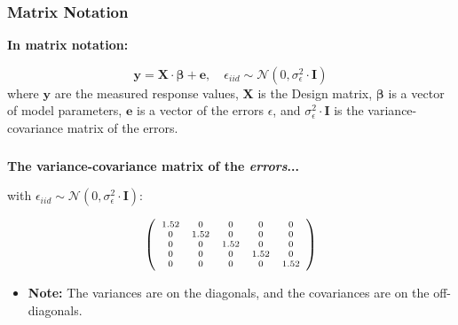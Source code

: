 \documentclass{beamer}
\begin{document}
\begin{frame}
  \frametitle{Matrix Notation}
  \textbf{In matrix notation:}
  
  \begin{equation*}
  \mathbf{y} = \mathbf{X} \cdot \mathbf{\beta} + \mathbf{e}, \quad \epsilon_{iid} \sim \mathcal{N}(0, \sigma^2_{\epsilon} \cdot \mathbf{I})
  \end{equation*}
  where $\mathbf{y}$ are the measured response values, $\mathbf{X}$ is the Design matrix, $\mathbf{\beta}$ is a vector of model parameters, $\mathbf{e}$ is a vector of the errors $\epsilon$, and $\sigma^2_{\epsilon} \cdot \mathbf{I}$ is the variance-covariance matrix of the errors.
\end{frame}

\begin{frame}
  \frametitle{}
  \textbf{The variance-covariance matrix of the \textit{errors}...}

  with $\epsilon_{iid} \sim \mathcal{N}(0, \sigma^2_{\epsilon} \cdot \mathbf{I})$:
  \vspace{0.5cm}
  
  \begin{equation*}
  \scriptsize{\left( \begin{array}{ccccc} 1.52 & 0 & 0 & 0 & 0 \\ 0 & 1.52 & 0 & 0 & 0 \\ 0 & 0 & 1.52 & 0 & 0 \\ 0 & 0 & 0 & 1.52 & 0 \\ 0 & 0 & 0 & 0 & 1.52 \end{array}\right)}
  \end{equation*}
 \vspace{0.5cm}
 
  \begin{itemize}
    \item \textbf{Note:} The variances are on the diagonals, and the covariances are on the off-diagonals.
  \end{itemize}
\end{frame}
\end{document}
